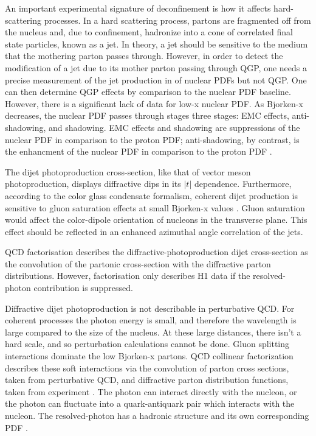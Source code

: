 An important experimental signature of deconfinement is how it affects hard-scattering processes. In a hard scattering process, partons are fragmented off from the nucleus and, due to confinement, hadronize into a cone of correlated final state particles, known as a jet. In theory, a jet should be sensitive to the medium that the mothering parton passes through. However, in order to detect the modification of a jet due to its mother parton passing through QGP, one needs a precise measurement of the jet production in of nuclear PDFs but not QGP. One can then determine QGP effects by comparison to the nuclear PDF baseline. However, there is a significant lack of data for low-x nuclear PDF. As Bjorken-x decreases, the nuclear PDF passes through stages three stages: EMC effects, anti-shadowing, and shadowing. EMC effects and shadowing are suppressions of the nuclear PDF in comparison to the proton PDF; anti-shadowing, by contrast, is the enhancment of the nuclear PDF in comparison to the proton PDF \cite{Strikman:2005yv}. 

The dijet photoproduction cross-section, like that of vector meson photoproduction, displays diffractive dips in its $|t|$ dependence. Furthermore, according to the color glass condensate formalism, coherent dijet production is sensitive to gluon saturation effects at small Bjorken-x values \cite{Guzey:2016awf}\cite{Guzey:2016tek}. Gluon saturation would affect the color-dipole orientation of nucleons in the transverse plane. This effect should be reflected in an enhanced azimuthal angle correlation of the jets. 

QCD factorisation describes the diffractive-photoproduction dijet cross-section as the convolution of the partonic cross-section with the diffractive parton distributions. However, factorisation only describes H1 data if the resolved-photon contribution is suppressed. 

Diffractive dijet photoproduction is not describable in perturbative QCD. For coherent processes the photon energy is small, and therefore the wavelength is large compared to the size of the nucleus. At these large distances, there isn't a hard scale, and so perturbation calculations cannot be done. Gluon splitting interactions dominate the low Bjorken-x partons. QCD collinear factorization describes these soft interactions via the convolution of parton cross sections, taken from perturbative QCD, and diffractive parton distribution functions, taken from experiment \cite{Andreev:2015cwa} \cite{Chekanov:2008fh}. The photon can interact directly with the nucleon, or the photon can fluctuate into a quark-antiquark pair which interacts with the nucleon. The resolved-photon has a hadronic structure and its own corresponding PDF \cite{Bauer:1977iq}.

